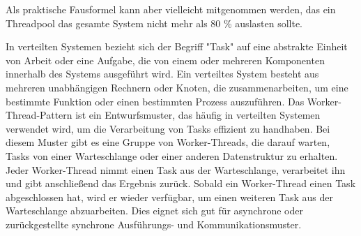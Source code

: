 Als praktische Fausformel kann aber vielleicht mitgenommen werden, das ein Threadpool das gesamte System nicht mehr als 80 \% auslasten sollte. 

In verteilten Systemen bezieht sich der Begriff "Task" auf eine abstrakte Einheit von Arbeit oder eine Aufgabe, die von einem oder mehreren Komponenten innerhalb des Systems ausgeführt wird. Ein verteiltes System besteht aus mehreren unabhängigen Rechnern oder Knoten, die zusammenarbeiten, um eine bestimmte Funktion oder einen bestimmten Prozess auszuführen. Das Worker-Thread-Pattern ist ein Entwurfsmuster, das häufig in verteilten Systemen verwendet wird, um die Verarbeitung von Tasks effizient zu handhaben. Bei diesem Muster gibt es eine Gruppe von Worker-Threads, die darauf warten, Tasks von einer Warteschlange oder einer anderen Datenstruktur zu erhalten. Jeder Worker-Thread nimmt einen Task aus der Warteschlange, verarbeitet ihn und gibt anschließend das Ergebnis zurück. Sobald ein Worker-Thread einen Task abgeschlossen hat, wird er wieder verfügbar, um einen weiteren Task aus der Warteschlange abzuarbeiten. Dies eignet sich gut für asynchrone oder zurückgestellte synchrone Ausführungs- und Kommunikationsmuster. 

